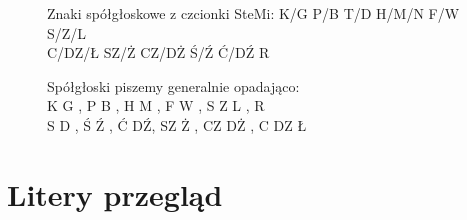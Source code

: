 \documentclass[letterpaper,10pt,polish]{sphinxmanual}
\begin{document}
\begin{figure}[htbp]
\centering
\capstart

\noindent{}
\caption{Znaki spółgłoskowe z czcionki SteMi:
K/G P/B T/D H/M/N F/W S/Z/L \\
C/DZ/Ł SZ/Ż CZ/DŻ Ś/Ź Ć/DŹ R}\label{\detokenize{alfabet-stemi:id5}}\end{figure}

\begin{figure}[htbp]
\centering
\capstart

\noindent{}
\caption{Spółgłoski piszemy generalnie opadająco: \\
K G ,  P B ,  H M ,  F W ,  S Z L ,  R \\
S D ,  Ś Ź ,  Ć DŹ,  SZ Ż ,  CZ DŻ ,  C DZ Ł}\label{\detokenize{alfabet-stemi:id6}}\end{figure}


\section{Litery przegląd}
\label{\detokenize{alfabet-stemi:litery-przeglad}}
\end{document}
